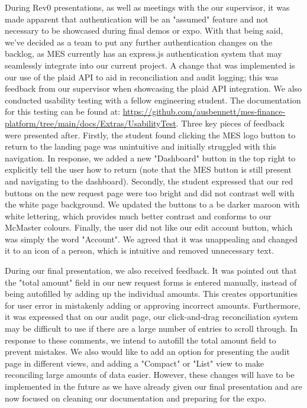 \documentclass[12pt, titlepage]{article}
\begin{document}

During Rev0 presentations, as well as meetings with the our supervisor, it was made apparent that authentication will be an "assumed" feature and not necessary to be showcased during final demos or expo. With that being said, we've decided as a team to put any further authentication changes on the backlog, as MES currently has an express.js authentication system that may seamlessly integrate into our current project. A change that was implemented is our use of the plaid API to aid in reconciliation and audit logging; this was feedback from our supervisor when showcasing the plaid API integration. 
We also conducted usability testing with a fellow engineering student. The documentation for this testing can be found at:
\url{https://github.com/ausbennett/mes-finance-platform/tree/main/docs/Extras/UsabilityTest}. Three key pieces of feedback were presented after. Firstly, the student found clicking the MES logo button to return to the landing page was unintuitive and initially struggled with this navigation. In response, we added a new "Dashboard" button in the top right to explicitly tell the user how to return (note that the MES button is still present and navigating to the dashboard). Secondly, the student expressed that our red buttons on the new request page were too bright and did not contrast well with the white page background. We updated the buttons to a be darker maroon with white lettering, which provides much better contrast and conforms to our McMaster colours. Finally, the user did not like our edit account button, which was simply the word "Account". We agreed that it was unappealing and changed it to an icon of a person, which is intuitive and removed unnecessary text.

During our final presentation, we also received feedback. It was pointed out that the "total amount" field in our new request forms is entered manually, instead of being autofilled by adding up the individual amounts. This creates opportunities for user error in mistakenly adding or approving incorrect amounts. Furthermore, it was expressed that on our audit page, our click-and-drag reconciliation system may be difficult to use if there are a large number of entries to scroll through. In response to these comments, we intend to autofill the total amount field to prevent mistakes. We also would like to add an option for presenting the audit page in different views, and adding a "Compact" or "List" view to make reconciling large amounts of data easier. However, these changes will have to be implemented in the future as we have already given our final presentation and are now focused on cleaning our documentation and preparing for the expo.
\end{document}
